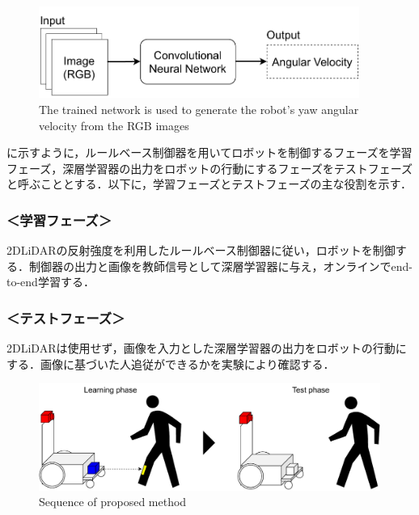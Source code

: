   \begin{figure}[h]
    \centering
    \includegraphics[height=3cm] {images/pdf/RobotGuidance_simple_system}
    \captionsetup{justification=raggedright} %
    \caption{The trained network is used to generate the robot's yaw angular velocity from the RGB images}
    \label{Fig:RobotGuidance_simple_system}
  \end{figure}

  に示すように，ルールベース制御器を用いてロボットを制御するフェーズを学習フェーズ，深層学習器の出力をロボットの行動にするフェーズをテストフェーズと呼ぶこととする．以下に，学習フェーズとテストフェーズの主な役割を示す．

  \subsubsection*{＜学習フェーズ＞}
  2DLiDARの反射強度を利用したルールベース制御器に従い，ロボットを制御する．制御器の出力と画像を教師信号として深層学習器に与え，オンラインでend-to-end学習する．
  
  \subsubsection*{＜テストフェーズ＞}
  2DLiDARは使用せず，画像を入力とした深層学習器の出力をロボットの行動にする．画像に基づいた人追従ができるかを実験により確認する．

  \begin{figure}[h]
    \centering
    \includegraphics[height=3.5cm] {images/pdf/RobotGuidance_all_system}
    \captionsetup{justification=raggedright} %
    \caption{Sequence of proposed method}
    \label{Fig:RobotGuidance_all_system}
  \end{figure}

\newpage
